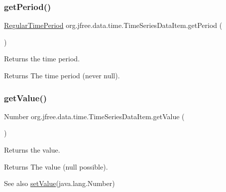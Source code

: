 \subsubsection{\texorpdfstring{get\+Period()}{getPeriod()}}
{\footnotesize\ttfamily \mbox{\hyperlink{classorg_1_1jfree_1_1data_1_1time_1_1_regular_time_period}{Regular\+Time\+Period}} org.\+jfree.\+data.\+time.\+Time\+Series\+Data\+Item.\+get\+Period (\begin{DoxyParamCaption}{ }\end{DoxyParamCaption})}

Returns the time period.

\begin{DoxyReturn}{Returns}
The time period (never {\ttfamily null}). 
\end{DoxyReturn}
\mbox{\label{classorg_1_1jfree_1_1data_1_1time_1_1_time_series_data_item_aae8a91f28931ae9e1207f64124294896}} 
\subsubsection{\texorpdfstring{get\+Value()}{getValue()}}
{\footnotesize\ttfamily Number org.\+jfree.\+data.\+time.\+Time\+Series\+Data\+Item.\+get\+Value (\begin{DoxyParamCaption}{ }\end{DoxyParamCaption})}

Returns the value.

\begin{DoxyReturn}{Returns}
The value ({\ttfamily null} possible).
\end{DoxyReturn}
\begin{DoxySeeAlso}{See also}
\mbox{\hyperlink{classorg_1_1jfree_1_1data_1_1time_1_1_time_series_data_item_af1b0f84dad2ed0cbced4746bd9c3a8d1}{set\+Value}}(java.\+lang.\+Number) 
\end{DoxySeeAlso}
\mbox{\label{classorg_1_1jfree_1_1data_1_1time_1_1_time_series_data_item_ab4e1a5f876ea48a68511a7fc8fbcff1c}} 
